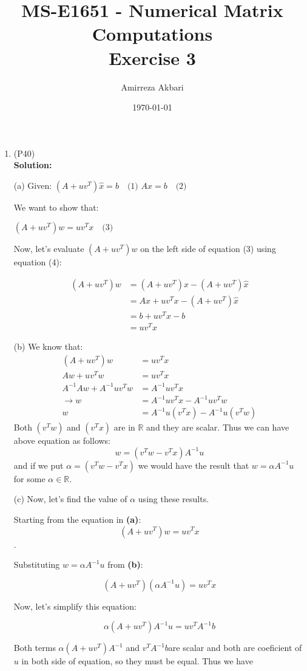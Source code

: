 \documentclass[12pt]{article}
\title{MS-E1651 - Numerical Matrix Computations
\\Exercise 3}
\author{Amirreza Akbari}
\date{\today}
\begin{document}
\maketitle
\begin{enumerate}[leftmargin=\labelsep]
	\item (P40)\\[0.5em]
\textbf{Solution:} 
	
(a) Given:
$
(A + uv^T)\hat{x} = b \quad \text{(1)}
$
$
Ax = b \quad \text{(2)}
$

We want to show that:

$
(A + uv^T)w = uv^Tx \quad \text{(3)}
$

Now, let's evaluate $(A + uv^T)w$ on the left side of equation (3) using equation (4):


\begin{align*}
(A + uv^T)w &= (A + uv^T)x - (A + uv^T)\hat{x}\\
&= Ax + uv^Tx - (A + uv^T)\hat{x} \\
&= b + uv^Tx - b  \\
&= uv^Tx
\end{align*}

(b) We know that:
\begin{align*}
(A + uv^T)w &= uv^Tx\\
Aw + uv^Tw & = uv^Tx\\
A^{-1}Aw + A^{-1}uv^Tw &= A^{-1}uv^Tx\\
\rightarrow w &= A^{-1}uv^Tx - A^{-1}uv^Tw\\
w &= A^{-1}u(v^Tx) - A^{-1}u(v^Tw)
\end{align*}
Both $(v^Tw)$ and $(v^Tx)$ are in $\mathbb{R}$ and they are scalar. Thus we can have above equation as follows:
$$w = (v^Tw - v^Tx)A^{-1}u$$
and if we put $\alpha = (v^Tw - v^Tx)$ we would have the result that $w = \alpha A^{-1}u$ for some $\alpha \in \mathbb{R}$.

(c) Now, let's find the value of $\alpha$ using these results.

Starting from the equation in \textbf{(a)}: $$(A + uv^T)w = uv^Tx$$.

Substituting $w = \alpha A^{-1}u$ from \textbf{(b)}:

$$(A + uv^T)(\alpha A^{-1}u) = uv^Tx$$

Now, let's simplify this equation:

$$\alpha(A + uv^T)A^{-1}u = uv^TA^{-1}b$$

Both terms $\alpha(A + uv^T)A^{-1}$ and $v^TA^{-1}b$are scalar and both are coeficient of $u$ in both side of equation, so they must be equal. Thus we have


\end{enumerate}
\end{document}
